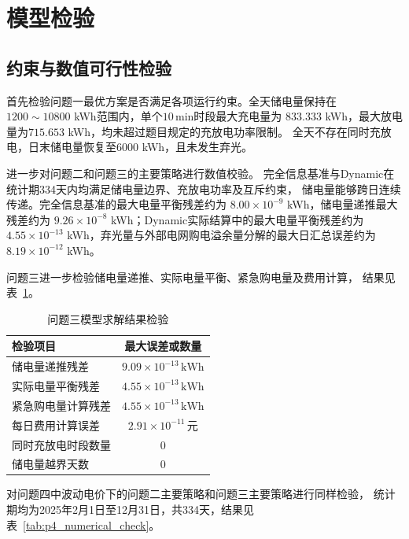 \section{模型检验}

\subsection{约束与数值可行性检验}

首先检验问题一最优方案是否满足各项运行约束。全天储电量保持在
$1200\sim10800$ kWh范围内，单个$10\,\mathrm{min}$时段最大充电量为
$833.333$ kWh，最大放电量为$715.653$ kWh，均未超过题目规定的充放电功率限制。
全天不存在同时充放电，日末储电量恢复至$6000$ kWh，且未发生弃光。

进一步对问题二和问题三的主要策略进行数值校验。
完全信息基准与Dynamic在统计期334天内均满足储电量边界、充放电功率及互斥约束，
储电量能够跨日连续传递。完全信息基准的最大电量平衡残差约为
$8.00\times10^{-9}$ kWh，储电量递推最大残差约为
$9.26\times10^{-8}$ kWh；Dynamic实际结算中的最大电量平衡残差约为
$4.55\times10^{-13}$ kWh，弃光量与外部电网购电溢余量分解的最大日汇总误差约为
$8.19\times10^{-12}$ kWh。

问题三进一步检验储电量递推、实际电量平衡、紧急购电量及费用计算，
结果见表~\ref{tab:p3_check}。

\begin{table}[H]
\centering
\caption{问题三模型求解结果检验}
\label{tab:p3_check}
\begin{tabular}{lc}
\toprule
检验项目 & 最大误差或数量 \\
\midrule
储电量递推残差 & $9.09\times10^{-13}\,\mathrm{kWh}$ \\
实际电量平衡残差 & $4.55\times10^{-13}\,\mathrm{kWh}$ \\
紧急购电量计算残差 & $4.55\times10^{-13}\,\mathrm{kWh}$ \\
每日费用计算误差 & $2.91\times10^{-11}$\,元 \\
同时充放电时段数量 & $0$ \\
储电量越界天数 & $0$ \\
\bottomrule
\end{tabular}
\end{table}

对问题四中波动电价下的问题二主要策略和问题三主要策略进行同样检验，
统计期均为2025年2月1日至12月31日，共334天，结果见表~\ref{tab:p4_numerical_check}。

